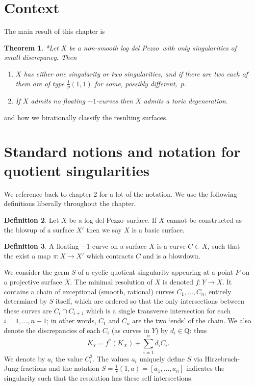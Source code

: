 \documentclass[12pt,a4paper]{book}      %
\newtheorem{thm}{Theorem}[section]
\theoremstyle{definition}
\newtheorem{dfn}[thm]{Definition}
\newcommand{\ldp}{log del Pezzo}
\newcommand{\Q}{\mathrm{Q}}
\begin{document}
\section{Context}
The main result of this chapter is 
\begin{thm}*\label{ThmOnSing}
Let $X$ be a non-smooth \ldp\ with only singularities of small discrepancy. Then 
\begin{enumerate}
\item\label{thm38i}
$X$ has either one singularity or two singularities, and if there are two each of them are of type $\frac{1}p(1,1)$ for some, possibly different,~$p$.
\item\label{thm38ii}
If $X$ admits no floating $-1$-curves then $X$ admits a toric degeneration. %
\end{enumerate}
\end{thm}
and how we birationally classify the resulting surfaces.

\section{Standard notions and notation for quotient singularities}
We reference back to chapter 2 for a lot of the notation. We use the following definitions liberally throughout the chapter.
\begin{dfn}
Let $X$ be a \ldp\ surface. If $X$ cannot be constructed as the blowup of a surface $X'$ then we say $X$ is a basic surface.

\end{dfn}

\begin{dfn}
A floating $-1$-curve on a surface $X$ is a curve $C \subset X$, such that the exist a map $\pi \colon X \rightarrow X'$ which contracts $C$ and is a blowdown.
\end{dfn}

We consider the germ $S$ of a cyclic quotient singularity appearing at a point $P$ on a 
projective surface $X$.
The minimal resolution of $X$ is denoted $f\colon Y \longrightarrow X$. It contains a chain of
exceptional (smooth, rational)
curves $C_1,\dots,C_n$, entirely determined by $S$ itself, which are ordered so
that the only intersections between these curves are
$C_i\cap C_{i+1}$ which is a single transverse intersection for each $i=1,\dots,n-1$; 
in other words,
$C_1$ and $C_n$ are the two `ends' of the chain.
We also denote the discrepancies of each $C_i$ (as curves in $Y$) by $d_i\in\Q$: thus
\[\
K_Y = f^*(K_X) + \sum_{i=1}^n d_i C_i.
\]
We denote by $a_i$ the value $C_i^2$. The values $a_i$ uniquely define $S$ via Hirzebruch-Jung fractions \cite{Reid-cyclic} and the notation $S=\frac{1}{r}(1, a) = [a_1, \dots , a_n]$ indicates the singularity such that the resolution has these self intersections.
\label{sec!notation}
\end{document}
